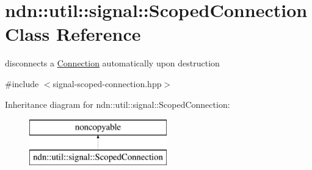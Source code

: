 \hypertarget{classndn_1_1util_1_1signal_1_1ScopedConnection}{}\section{ndn\+:\+:util\+:\+:signal\+:\+:Scoped\+Connection Class Reference}
\label{classndn_1_1util_1_1signal_1_1ScopedConnection}


disconnects a \hyperlink{classndn_1_1util_1_1signal_1_1Connection}{Connection} automatically upon destruction  




{\ttfamily \#include $<$signal-\/scoped-\/connection.\+hpp$>$}

Inheritance diagram for ndn\+:\+:util\+:\+:signal\+:\+:Scoped\+Connection\+:\begin{figure}[H]
\begin{center}
\leavevmode
\includegraphics[height=2.000000cm]{classndn_1_1util_1_1signal_1_1ScopedConnection}
\end{center}
\end{figure}
